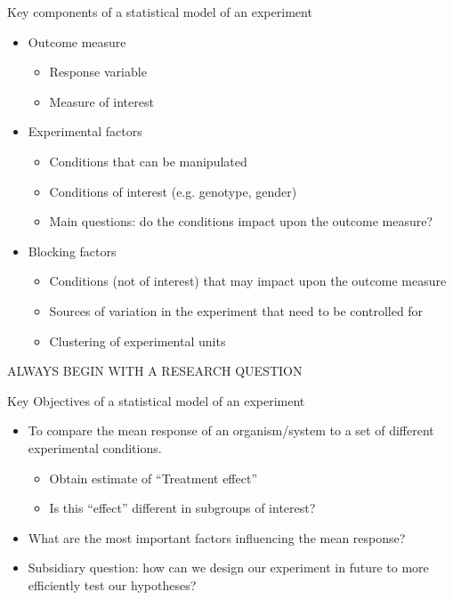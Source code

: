 \documentclass{beamer}
\begin{document}
\begin{frame}{Key components of a statistical model of an experiment}
 \begin{itemize}
  
\item Outcome measure
  \begin{itemize}
    \item Response variable
    \item Measure of interest
  \end{itemize}
\item Experimental factors 
  \begin{itemize}
    \item Conditions that can be manipulated 
    \item Conditions of interest (e.g. genotype, gender) 
    \item Main questions: do the conditions impact upon the outcome measure?
  \end{itemize}
\item Blocking factors
  \begin{itemize}
    \item Conditions (not of interest) that may impact upon the outcome measure
    \item Sources of variation in the experiment that need to be controlled for
    \item Clustering of experimental units
 \end{itemize}
\end{itemize}


ALWAYS BEGIN WITH A RESEARCH QUESTION
\end{frame}

\begin{frame}{Key Objectives of a statistical model of an experiment}
\begin{itemize}
 \item To compare the mean response of an organism/system to a set of different experimental conditions.
  \begin{itemize}
   \item Obtain estimate of “Treatment effect”
   \item Is this “effect” different in subgroups of interest?
  \end{itemize}
 \item What are the most important factors influencing the mean response? 
 \item Subsidiary question: how can we design our experiment in future to more efficiently test our hypotheses?
\end{itemize}


\end{frame}
\end{document}
